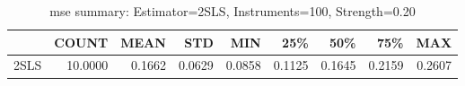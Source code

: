 \begin{table}[ht]
\centering
\caption{mse summary: Estimator=2SLS, Instruments=100, Strength=0.20}
\begin{tabular}{lrrrrrrrr}
\toprule
 & COUNT & MEAN & STD & MIN & 25\% & 50\% & 75\% & MAX \\
\midrule
2SLS & 10.0000 & 0.1662 & 0.0629 & 0.0858 & 0.1125 & 0.1645 & 0.2159 & 0.2607 \\
\bottomrule
\end{tabular}
\end{table}
